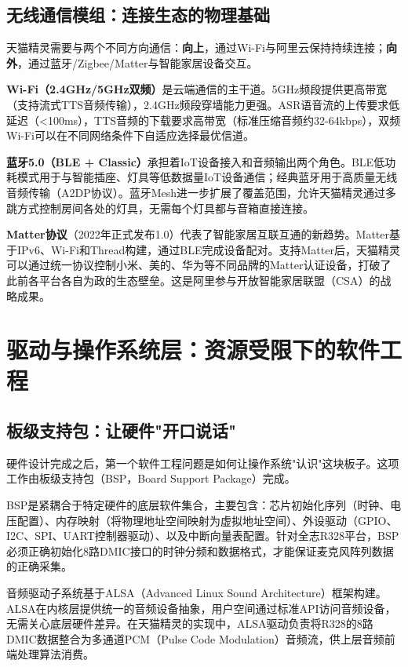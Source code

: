 \documentclass[12pt, a4paper, twoside, openright]{book}
\begin{document}
\section{无线通信模组：连接生态的物理基础}

天猫精灵需要与两个不同方向通信：\textbf{向上}，通过Wi-Fi与阿里云保持持续连接；\textbf{向外}，通过蓝牙/Zigbee/Matter与智能家居设备交互。

\textbf{Wi-Fi（2.4GHz/5GHz双频）}是云端通信的主干道。5GHz频段提供更高带宽（支持流式TTS音频传输），2.4GHz频段穿墙能力更强。ASR语音流的上传要求低延迟（<100ms），TTS音频的下载要求高带宽（标准压缩音频约32-64kbps），双频Wi-Fi可以在不同网络条件下自适应选择最优信道。

\textbf{蓝牙5.0（BLE + Classic）}承担着IoT设备接入和音频输出两个角色。BLE低功耗模式用于与智能插座、灯具等低数据量IoT设备通信；经典蓝牙用于高质量无线音频传输（A2DP协议）。蓝牙Mesh进一步扩展了覆盖范围，允许天猫精灵通过多跳方式控制房间各处的灯具，无需每个灯具都与音箱直接连接。

\textbf{Matter协议}（2022年正式发布1.0）代表了智能家居互联互通的新趋势。Matter基于IPv6、Wi-Fi和Thread构建，通过BLE完成设备配对。支持Matter后，天猫精灵可以通过统一协议控制小米、美的、华为等不同品牌的Matter认证设备，打破了此前各平台各自为政的生态壁垒。这是阿里参与开放智能家居联盟（CSA）的战略成果。

\chapter{驱动与操作系统层：资源受限下的软件工程}
\label{chap:os}

\section{板级支持包：让硬件"开口说话"}

硬件设计完成之后，第一个软件工程问题是如何让操作系统"认识"这块板子。这项工作由板级支持包（BSP，Board Support Package）完成。

BSP是紧耦合于特定硬件的底层软件集合，主要包含：芯片初始化序列（时钟、电压配置）、内存映射（将物理地址空间映射为虚拟地址空间）、外设驱动（GPIO、I2C、SPI、UART控制器驱动）、以及中断向量表配置。针对全志R328平台，BSP必须正确初始化8路DMIC接口的时钟分频和数据格式，才能保证麦克风阵列数据的正确采集。

音频驱动子系统基于ALSA（Advanced Linux Sound Architecture）框架构建。ALSA在内核层提供统一的音频设备抽象，用户空间通过标准API访问音频设备，无需关心底层硬件差异。在天猫精灵的实现中，ALSA驱动负责将R328的8路DMIC数据整合为多通道PCM（Pulse Code Modulation）音频流，供上层音频前端处理算法消费。
\end{document}
